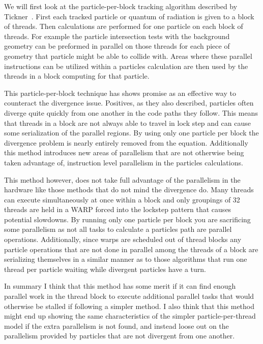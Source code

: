 We will first look at the particle-per-block tracking algorithm described by Tickner~\cite{tickner2010monte}.
%
First each tracked particle or quantum of radiation is given to a block of threads.
%
Then calculations are performed for one particle on each block of threads.
%
For example the particle intersection tests with the background geometry can be preformed in parallel on those threads for each piece of geometry that particle might be able to collide with.
%
Areas where these parallel instructions can be utilized within a particles calculation are then used by the threads in a block computing for that particle.
%

This particle-per-block technique has shows promise as an effective way to counteract the divergence issue.
%
Positives, as they also described, particles often diverge quite quickly from one another in the code paths they follow.
%
This means that threads in a block are not always able to travel in lock step and can cause some serialization of the parallel regions.
%
By using only one particle per block the divergence problem is nearly entirely removed from the equation.
%
Additionally this method introduces new areas of parallelism that are not otherwise being taken advantage of, instruction level parallelism in the particles calculations.
%

%
This method however, does not take full advantage of the parallelism in the hardware like those methods that do not mind the divergence do.
%
Many threads can execute simultaneously at once within a block and only groupings of 32 threads are held in a WARP forced into the lockstep pattern that causes potential slowdowns.
%
By running only one particle per block you are sacrificing some parallelism as not all tasks to calculate a particles path are parallel operations.
%
Additionally, since warps are scheduled out of thread blocks any particle operations that are not done in parallel among the threads of a block are serializing themselves in a similar manner as to those algorithms that run one thread per particle waiting while divergent particles have a turn.
%

In summary I think that this method has some merit if it can find enough parallel work in the thread block to execute additional parallel tasks that would otherwise be stalled if following a simpler method.
%
I also think that this method might end up showing the same characteristics of the simpler particle-per-thread model if the extra parallelism is not found, and instead loose out on the parallelism provided by particles that are not divergent from one another. 


